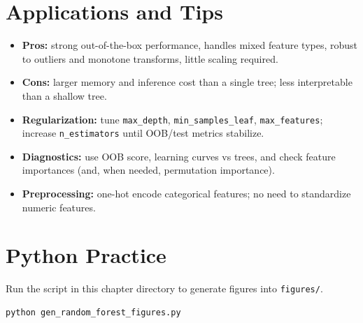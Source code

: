 \documentclass[11pt]{article}
\begin{document}
\section{Applications and Tips}
\begin{itemize}
  \item \textbf{Pros:} strong out-of-the-box performance, handles mixed feature types, robust to outliers and monotone transforms, little scaling required.
  \item \textbf{Cons:} larger memory and inference cost than a single tree; less interpretable than a shallow tree.
  \item \textbf{Regularization:} tune \texttt{max\_depth}, \texttt{min\_samples\_leaf}, \texttt{max\_features}; increase \texttt{n\_estimators} until OOB/test metrics stabilize.
  \item \textbf{Diagnostics:} use OOB score, learning curves vs trees, and check feature importances (and, when needed, permutation importance).
  \item \textbf{Preprocessing:} one-hot encode categorical features; no need to standardize numeric features.
\end{itemize}

\section{Python Practice}
Run the script in this chapter directory to generate figures into \texttt{figures/}.
\begin{lstlisting}[style=code,caption={Generate Random Forest figures},label={lst:genfigs_rf}]
python gen_random_forest_figures.py
\end{lstlisting}


\end{document}
